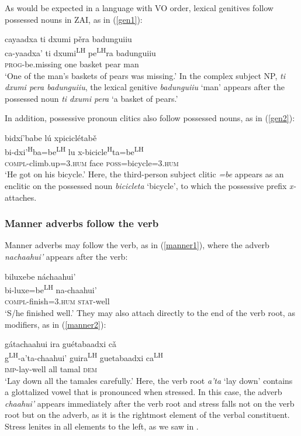 As would be expected in a language with VO order, lexical genitives follow possessed nouns in ZAI, as in (\ref{gen1}): 

\ea\label{gen1}
\glll cayaadxa ti dxumi p\v{e}ra badunguiiu \\
ca-yaadxa' ti dxumi\textsuperscript{LH} pe\textsuperscript{LH}ra badunguiiu \\
\textsc{prog}-be.missing one basket pear man \\
\glt `One of the man's baskets of pears was missing.'
\z
In the complex subject NP, \textit{ti dxumi pera badunguiiu}, the lexical genitive \textit{badunguiiu} `man' appears after the possessed noun \textit{ti dxumi pera} `a basket of pears.'

In addition, possessive pronoun clitics also follow possessed nouns, as in (\ref{gen2}):

\ea\label{gen2}
\glll bidx\'{i}'babe l\'{u} xpicicl\'{e}tab\v{e} \\
bi-dxi'\textsuperscript{H}ba=be\textsuperscript{LH} lu x-bicicle\textsuperscript{H}ta=be\textsuperscript{LH} \\
\textsc{compl}-climb.up=\textsc{3.hum} face \textsc{poss}=bicycle=\textsc{3.hum} \\
\glt `He got on his bicycle.'
\z
Here, the third-person subject clitic \textit{=be} appears as an enclitic on the possessed noun \textit{bicicleta} `bicycle', to which the possessive prefix \textit{x-} attaches.



\subsubsection{Manner adverbs follow the verb}

Manner adverbs may follow the verb, as in (\ref{manner1}), where the adverb \textit{nachaahui'} appears after the verb: 

\ea\label{manner1}
\glll biluxebe n\'{a}chaahui' \\
bi-luxe=be\textsuperscript{LH} na-chaahui' \\
\textsc{compl}-finish=\textsc{3.hum} \textsc{stat}-well \\
\glt `S/he finished well.'
\z
They may also attach directly to the end of the verb root, as modifiers, as in (\ref{manner2}):

\ea\label{manner2}
\glll g\'{a}tachaahui ira gu\'{e}tabaadxi c\v{a} \\
g\textsuperscript{LH}-a'ta-chaahui' guira\textsuperscript{LH} guetabaadxi ca\textsuperscript{LH} \\
\textsc{imp}-lay-well all tamal \textsc{dem} \\
\glt `Lay down all the tamales carefully.'
\z
Here, the verb root \textit{a'ta} `lay down' contains a glottalized vowel that is pronounced when stressed. In this case, the adverb \textit{chaahui'} appears immediately after the verb root and stress falls not on the verb root but on the adverb, as it is the rightmost element of the verbal constituent. Stress lenites in all elements to the left, as we saw in . 

